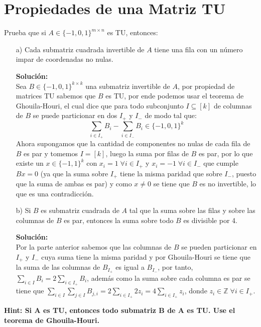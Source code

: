 \documentclass[10pt]{article}
\theoremstyle{plain}
\theoremstyle{definition}
\begin{document}
\section{Propiedades de una Matriz TU}
Prueba que si $A\in\{-1,0,1\}^{m\times n}$ es TU, entonces:
\begin{itemize}
    \item[a)] Cada submatriz cuadrada invertible de $A$ tiene una fila con un número impar de coordenadas no nulas.
    
    \textbf{Solución:}\\
    Sea $B\in \{-1,0,1\}^{k\times k}$ una submatriz invertible de $A$, por propiedad de matrices TU sabemos que $B$ es TU, por ende podemos usar el teorema de Ghouila-Houri, el cual dice que para todo subconjunto $I\subseteq[k]$ de columnas de $B$ se puede particionar en dos $I_{+}$ y $I_{-}$ de modo tal que:
    \begin{equation*}
        \sum_{i\in I_{+}}B_{i}- \sum_{i\in I_{-}}B_{i} \in \{-1, 0, 1\}^{k}
    \end{equation*}
    Ahora supongamos que la cantidad de componentes no nulas de cada fila de $B$ es par y tomemos $I=[k]$, luego la suma por filas de $B$ es par, por lo que existe un $x\in\{-1,1\}^{k}$ con $x_{i} = 1 \;\forall i \in I_{+}$ y $x_{i} = -1 \;\forall i \in I_{-}$ que cumple $Bx=0$ (ya que la suma sobre $I_{+}$ tiene la misma paridad que sobre $I_{-}$, puesto que la suma de ambas es par) y como $x\neq0$ se tiene que $B$ es no invertible, lo que es una contradicción.
    \item[b)] Si $B$ es submatriz cuadrada de $A$ tal que la suma sobre las filas y sobre las columnas de $B$ es par, entonces la suma sobre todo $B$ es divisible por 4.
    
    \textbf{Solución:}\\
    Por la parte anterior sabemos que las columnas de $B$ se pueden particionar en $I_{+}$ y $I_{-}$ cuya suma tiene la misma paridad y por Ghouila-Houri se tiene que la suma de las columnas de $B_{I_{+}}$ es igual a $B_{I_{-}}$, por tanto, $\sum_{i\in I}B_{i}=2\sum_{i\in I_{+}}B_{i}$, además como la suma sobre cada columna es par se tiene que $\sum_{i\in I}\sum_{j\in I}B_{j,i} = 2\sum_{i\in I_{+}}2 z_{i}=4\sum_{i\in I_{+}}z_{i}$, donde $z_{i}\in\mathbb{Z} \;\forall i \in I_{+}$.
      
\end{itemize}
\textbf{Hint: Si A es TU, entonces todo submatriz B de A es TU. Use el teorema de Ghouila-Houri.}
\end{document}
